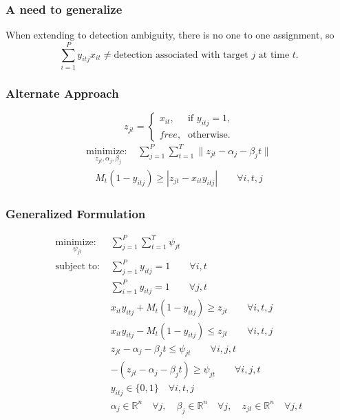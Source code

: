 \documentclass{beamer}
\begin{document}
\begin{frame}
\frametitle{A need to generalize}
When extending to detection ambiguity, there is no one to one assignment, so 
$$\sum_{i=1}^{P}y_{itj}x_{it} \neq \text{detection associated with target $j$ at time $t$}.$$
\end{frame}

\begin{frame}
\frametitle{Alternate Approach}
\[z_{jt} =
\begin{cases}
x_{it}, & \text{if $y_{itj} = 1$,} \\
\textit{free}, & \text{otherwise.}
\end{cases}\]
\begin{align*}
\underset{z_{jt}, \alpha_{j}, \beta_{j}}{\text{minimize: }} & \sum_{j=1}^{P} \sum_{t=1}^{T} \|z_{jt} - \alpha_{j} - \beta_{j}t\|
\end{align*}
\begin{align*}
M_{t}(1-y_{itj}) \geq |z_{jt} - x_{it}y_{itj}| \qquad \forall i,t,j
\end{align*}
\end{frame}

\begin{frame}[shrink=20]
\frametitle{Generalized Formulation}
\begin{align*}
\underset{\psi_{jt}}{\text{minimize: }} & \sum_{j=1}^{P} \sum_{t=1}^{T} \psi_{jt}\\
\text{subject to: }	& \sum_{j=1}^{P} y_{itj} = 1 \qquad \forall i,t\nonumber\\
				& \sum_{i=1}^{P} y_{itj} = 1 \qquad \forall j,t\nonumber\\
				& x_{it}y_{itj} + M_{t}(1-y_{itj}) \geq z_{jt} \qquad \forall i,t,j\nonumber\\
				& x_{it}y_{itj} - M_{t}(1-y_{itj}) \leq z_{jt} \qquad \forall i,t,j\nonumber\\
				& z_{jt} - \alpha_{j} - \beta_{j}t \leq \psi_{jt} \qquad \forall i,j,t\nonumber\\
				& -(z_{jt} - \alpha_{j} - \beta_{j}t) \geq \psi_{jt} \qquad \forall i,j,t\nonumber\\
			 	& y_{itj} \in \{0,1\} \quad \forall i,t,j\nonumber\\
				& \alpha_{j} \in \mathbb{R}^n \quad \forall j,\quad \beta_{j} \in \mathbb{R}^n \quad \forall j, \quad z_{jt} \in \mathbb{R}^n \quad \forall j,t\nonumber
\end{align*}
\end{frame}
\end{document}

